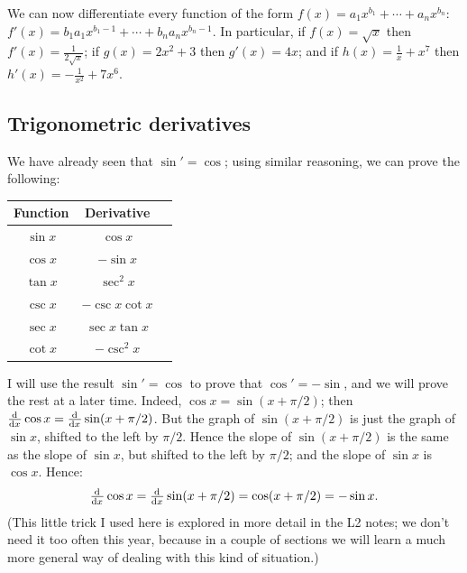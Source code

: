 \begin{ex}
  We can now differentiate every function of the form $ f(x) = a_1 x^{b_1} + \cdots + a_n x^{b_n} $: $ f'(x) = b_1 a_1 x^{b_1 - 1} + \cdots + b_n a_n x^{b_n - 1} $.
  In particular, if $ f(x) = \sqrt{x} $ then $ f'(x) = \frac{1}{2\sqrt{x}} $; if $ g(x) = 2x^2 + 3 $ then $ g'(x) = 4x $; and if $ h(x) = \frac{1}{x} + x^7 $
  then $ h'(x) = -\frac{1}{x^2} + 7x^6 $.
\end{ex}

\subsection{Trigonometric derivatives}
We have already seen that $ \sin' = \cos $; using similar reasoning, we can prove the following:
\begin{thm}
  \def\arraystretch{1.5}
  \begin{tabular}{|c|c|l|}\hline
    \textbf{Function} & \textbf{Derivative} \\\hline
    $ \sin x $ & $ \cos x $\\\hline
    $ \cos x $ & $ -\sin x $\\\hline
    $ \tan x $ & $ \sec^2 x $\\\hline
    $ \csc x $ & $ -\csc x \cot x $\\\hline
    $ \sec x $ & $ \sec x \tan x $\\\hline
    $ \cot x $ & $ -\csc^2 x $\\\hline
  \end{tabular}
\end{thm}

I will use the result $ \sin' = \cos $ to prove that $ \cos' = -\sin $, and we will prove
the rest at a later time. Indeed, $ \cos x = \sin (x + \pi/2) $; then $ \od{}{x} \cos x = \od{}{x} \sin(x + \pi/2) $.
But the graph of $ \sin(x + \pi/2) $ is just the graph of $ \sin x $, shifted to the left
by $ \pi/2 $. Hence the slope of $ \sin (x + \pi/2) $ is the same as the slope of $ \sin x $,
but shifted to the left by $ \pi/2 $; and the slope of $ \sin x $ is $ \cos x $. Hence:
\begin{equation}
  \od{}{x} \cos x = \od{}{x} \sin(x + \pi/2) = \cos(x + \pi/2) = -\sin x.
\end{equation}
(This little trick I used here is explored in more detail in the L2 notes; we don't need it
too often this year, because in a couple of sections we will learn a much more general way
of dealing with this kind of situation.)


